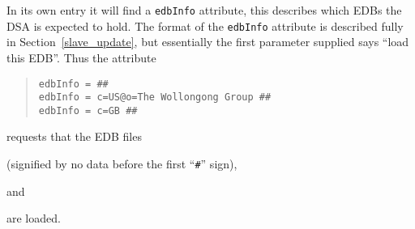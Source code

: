 In its own entry it will find a \verb"edbInfo" attribute, this 
describes which EDBs the DSA is expected to hold.
The format of the \verb"edbInfo"  attribute is described fully in 
Section~\ref{slave_update}, but essentially the first parameter
supplied says ``load this EDB''. Thus the attribute
\begin{quote}\begin{verbatim}
edbInfo = ##
edbInfo = c=US@o=The Wollongong Group ##
edbInfo = c=GB ##
\end{verbatim}\end{quote}
requests that the EDB files 
\begin{quote}
\end{quote}
(signified by no data before the first ``\verb+#+'' sign),
\begin{quote}
\end{quote}
and 
\begin{quote}
\end{quote}
are loaded.

